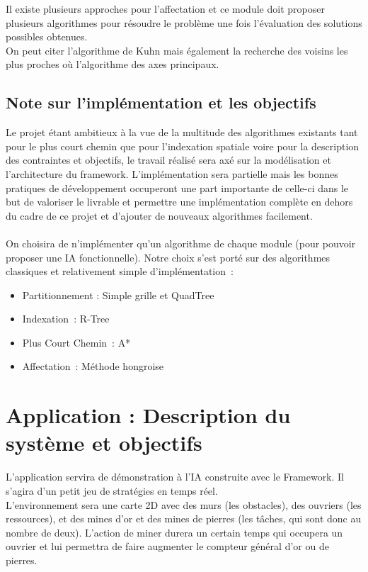 Il existe plusieurs approches pour l'affectation et ce module doit proposer plusieurs algorithmes pour résoudre le problème une fois l'évaluation des solutions possibles obtenues.\\
On peut citer l'algorithme de Kuhn mais également la recherche des voisins les plus proches où l'algorithme des axes principaux.

\subsection{Note sur l'implémentation et les objectifs}

Le projet étant ambitieux à la vue de la multitude des algorithmes existants tant pour le plus court chemin que pour l'indexation spatiale voire pour la description des contraintes et objectifs, le travail réalisé sera axé sur la modélisation et l'architecture du framework. L'implémentation sera partielle mais les bonnes pratiques de développement occuperont une part importante de celle-ci dans le but de valoriser le livrable et permettre une implémentation complète en dehors du cadre de ce projet et d'ajouter de nouveaux algorithmes facilement.\\\\

On choisira de n'implémenter qu'un algorithme de chaque module (pour pouvoir proposer une IA fonctionnelle). Notre choix s'est porté sur des algorithmes classiques et relativement simple d'implémentation :
\begin{itemize}
\item Partitionnement : Simple grille et QuadTree
\item Indexation : R-Tree
\item Plus Court Chemin : A*
\item Affectation : Méthode hongroise
\end{itemize}

\section{Application : Description du système et objectifs}

L'application servira de démonstration à l'IA construite avec le Framework. Il s'agira d'un petit jeu de stratégies en temps réel.\\
L'environnement sera une carte 2D avec des murs (les obstacles), des ouvriers (les ressources), et des mines d'or et des mines de pierres (les tâches, qui sont donc au nombre de deux). L'action de miner durera un certain temps qui occupera un ouvrier et lui permettra de faire augmenter le compteur général d'or ou de pierres.\\\\


